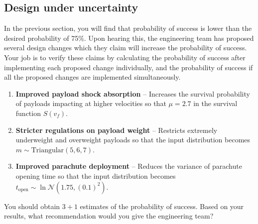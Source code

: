 \documentclass[11pt]{article}
\begin{document}
\subsection{Design under uncertainty}
In the previous section, you will find that probability of success is lower than the desired probability of 75\%. Upon hearing this, the engineering team has proposed several design changes which they claim will increase the probability of success. Your job is to verify these claims by calculating the probability of success after implementing each proposed change individually, and the probability of success if all the proposed changes are implemented simultaneously.
\begin{enumerate}
  \item \textbf{Improved payload shock absorption} -- Increases the survival probability of payloads impacting at higher velocities so that $\mu=2.7$ in the survival function $S(v_f)$.
  \item \textbf{Stricter regulations on payload weight} -- Restricts extremely underweight and overweight payloads so that the input distribution becomes $m\sim\text{Triangular}(5, 6, 7)$.
  \item \textbf{Improved parachute deployment} -- Reduces the variance of parachute opening time so that the input distribution becomes $t_\text{open}\sim\ln\mathcal{N}(1.75, (0.1)^2)$.
\end{enumerate}
You should obtain $3+1$ estimates of the probability of success. Based on your results, what recommendation would you give the engineering team?
\end{document}
